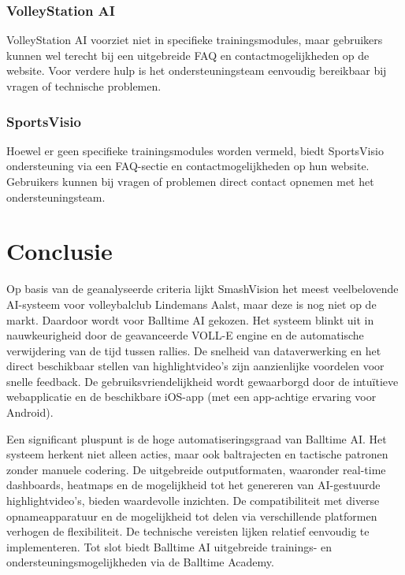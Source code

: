 \subsubsection{VolleyStation AI}
VolleyStation AI voorziet niet in specifieke trainingsmodules, maar gebruikers kunnen wel terecht bij een uitgebreide FAQ en contactmogelijkheden op de website. Voor verdere hulp is het ondersteuningsteam eenvoudig bereikbaar bij vragen of technische problemen.
\subsubsection{SportsVisio}
Hoewel er geen specifieke trainingsmodules worden vermeld, biedt SportsVisio ondersteuning via een FAQ-sectie en contactmogelijkheden op hun website. Gebruikers kunnen bij vragen of problemen direct contact opnemen met het ondersteuningsteam.

\section{Conclusie}
Op basis van de geanalyseerde criteria lijkt SmashVision het meest veelbelovende AI-systeem voor volleybalclub Lindemans Aalst, maar deze is nog niet op de markt. Daardoor wordt voor Balltime AI gekozen. Het systeem blinkt uit in nauwkeurigheid door de geavanceerde VOLL-E engine en de automatische verwijdering van de tijd tussen rallies. De snelheid van dataverwerking en het direct beschikbaar stellen van highlightvideo's zijn aanzienlijke voordelen voor snelle feedback. De gebruiksvriendelijkheid wordt gewaarborgd door de intuïtieve webapplicatie en de beschikbare iOS-app (met een app-achtige ervaring voor Android).

Een significant pluspunt is de hoge automatiseringsgraad van Balltime AI. Het systeem herkent niet alleen acties, maar ook baltrajecten en tactische patronen zonder manuele codering. De uitgebreide outputformaten, waaronder real-time dashboards, heatmaps en de mogelijkheid tot het genereren van AI-gestuurde highlightvideo's, bieden waardevolle inzichten. De compatibiliteit met diverse opnameapparatuur en de mogelijkheid tot delen via verschillende platformen verhogen de flexibiliteit. De technische vereisten lijken relatief eenvoudig te implementeren. Tot slot biedt Balltime AI uitgebreide trainings- en ondersteuningsmogelijkheden via de Balltime Academy.
